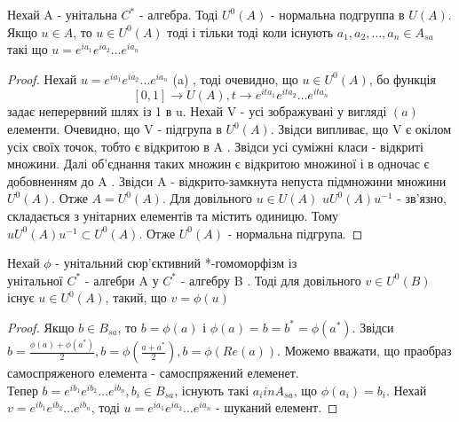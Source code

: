 \begin{theorem}
    Нехай A - унітальна $C^*$ - алгебра.
    Тоді $ U^0(A) $ - нормальна подгруппа в $ U(A) $.
    Якщо $u \in A$, то $u \in U^0(A)$ тоді і тільки тоді коли існують
    $a_1, a_2, \dots, a_n \in A_{sa}$ такі що $u = e^{i a_1} e^{i a_2} \dots e^{i a_n}$

    \begin{proof}
        Нехай $u = e^{i a_1} e^{i a_2} \dots e^{i a_n}$ (a) , тоді очевидно, що
        $u \in U^0(A) $, бо функція
        \[
            [0,1] \rightarrow U(A),
            t \rightarrow e^{i t a_1} e^{i t a_2} \dots e^{i t a_n}
        \]
        задає неперервний шлях із 1 в u.
        Нехай V - усі зображувані у вигляді $(a)$ елементи.
        Очевидно, що V - підгрупа в $U^0(A)$.
        Звідси випливає, що V є окілом усіх своїх точок,
        тобто є відкритою в A .
        Звідси усі суміжні класи - відкриті множини.
        Далі об'єднання таких множин є відкритою множиної і в одночас є
        добовненням до A .
        Звідси A - відкрито-замкнута непуста підмножини множини $U^0(A)$.
        Отже $A = U^0(A)$.
        Для довільного $u \in U(A)$ $uU^0(A)u^{-1}$ - зв'язно, складається
        з унітарних елементів та містить одиницю.
        Тому $uU^0(A)u^{-1} \subset U^0(A)$.
        Отже $U^0(A)$ - нормальна підгрупа.
    \end{proof}
\end{theorem}

\begin{corollary}
    \label{cor:1}
    Нехай $\phi$ - унітальний сюр'єктивний *-гомоморфізм із \\
    унітальної
    $C^*$ - алгебри A у $C^*$ - алгебру B .
    Тоді для довільного $v \in U^0(B)$ існує $u \in U^0(A)$,
    такий, що $v = \phi(u)$

    \begin{proof}
        Якщо $b \in B_{sa}$, то $b = \phi(a)$ і $\phi(a) = b = b^* = \phi(a^*)$.
        Звідси $b = \frac{\phi(a) + \phi(a^*)}{2}, b = \phi(\frac{a + a^*}{2}), b = \phi(Re(a))$.
        Можемо вважати, що праобраз \\ самоспряженого елемента - самоспряжений елеменет. \\
        Тепер $b = e^{i b_1} e^{i b_2} \dots e^{i b_n}, b_i \in B_{sa}$,
        існують такі $a_i in A_{sa}$, що $\phi(a_i) = b_i$.
        Нехай $v = e^{i b_1} e^{i b_2} \dots e^{i b_n}$, тоді
        $u = e^{i a_1} e^{i a_2} \dots e^{i a_n}$ - шуканий елемент.
    \end{proof}
\end{corollary}

